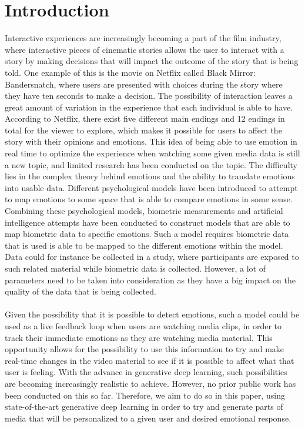 \chapter{Introduction}


Interactive experiences are increasingly becoming a part of the film industry, where interactive pieces of cinematic stories allows the user to interact with a story by making decisions that will impact the outcome of the story that is being told. One example of this is the movie on Netflix called Black Mirror: Bandersnatch, where users are presented with choices during the story where they have ten seconds to make a decision. The possibility of interaction leaves a great amount of variation in the experience that each individual is able to have. According to Netflix, there exist five different main endings and 12 endings in total for the viewer to explore, which makes it possible for users to affect the story with their opinions and emotions.
This idea of being able to use emotion in real time to optimize the experience when watching some given media data is still a new topic, and limited research has been conducted on the topic. The difficulty lies in the complex theory behind emotions and the ability to translate emotions into usable data.
Different psychological models have been introduced to attempt to map emotions to some space that is able to compare emotions in some sense. 
Combining these psychological models, biometric measurements and artificial intelligence attempts have been conducted to construct models that are able to map biometric data to specific emotions. Such a model requires biometric data that is used is able to be mapped to the different emotions within the model. Data could for instance be collected in a study, where participants are exposed to such related material while biometric data is collected. However, a lot of parameters need to be taken into consideration as they have a big impact on the quality of the data that is being collected.
\\ \\
Given the possibility that it is possible to detect emotions, such a model could be used as a live feedback loop when users are watching media clips,  in order to track their immediate emotions as they are watching media material. 
This opportunity allows for the possibility to use this information to try and make real-time changes in the video material to see if it is possible to affect what that user is feeling. With the advance in generative deep learning, such possibilities are becoming increasingly realistic to achieve. However, no prior public work has been conducted on this so far. Therefore, we aim to do so in this paper, using state-of-the-art generative deep learning in order to try and generate parts of media that will be personalized to a given user and desired emotional response. 





